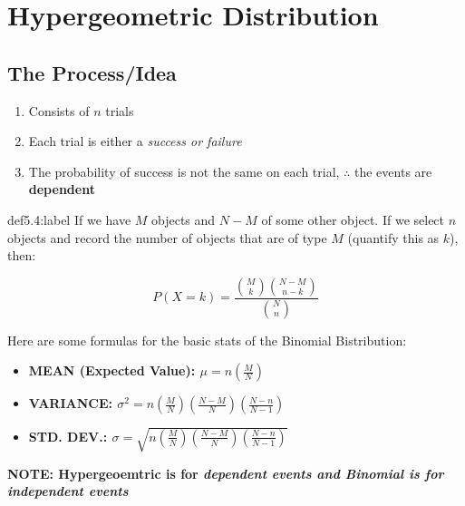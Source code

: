 \section{Hypergeometric Distribution}

\subsection{The Process/Idea}

\begin{enumerate}
    \item Consists of $n$ trials
    \item Each trial is either a \it{success} or \it{failure}
    \item The probability of success is not the same on each trial, $\therefore$ the events are \bf{dependent}
\end{enumerate}


\begin{definition}{def5.4:label}
    If we have $M$ objects and $N-M$ of some other object. If we select $n$ objects and record the number of objects that are of type $M$ (quantify this as $k$), then:

    $$
    P(X = k) = \frac{\binom{M}{k}\binom{N-M}{n-k}}{\binom{N}{n}}
    $$
\end{definition}

Here are some formulas for the basic stats of the Binomial Bistribution:

\begin{itemize}
    \item \bf{MEAN (Expected Value):} $\mu = n \left(\frac{M}{N}\right)$
    \item \bf{VARIANCE:} $\sigma^2 = n\left(\frac{M}{N}\right)\left(\frac{N-M}{N}\right)\left(\frac{N-n}{N-1}\right)$
    \item \bf{STD. DEV.:} $\sigma = \sqrt{n\left(\frac{M}{N}\right)\left(\frac{N-M}{N}\right)\left(\frac{N-n}{N-1}\right)}$
\end{itemize}

\bf{NOTE: Hypergeoemtric is for \it{dependent} events and Binomial is for \it{independent} events}